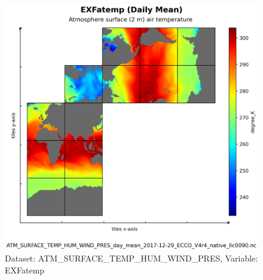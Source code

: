 \begin{figure}[H]
\centering
\includegraphics[scale=0.55]{../images/plots/native_plots/Atmosphere_Surface_Temperature_Humidity_Wind_and_Pressure/EXFatemp.png}
\caption{Dataset: ATM\_SURFACE\_TEMP\_HUM\_WIND\_PRES, Variable: EXFatemp}
\label{tab:table-ATM_SURFACE_TEMP_HUM_WIND_PRES_EXFatemp-Plot}
\end{figure}
\pagebreak
